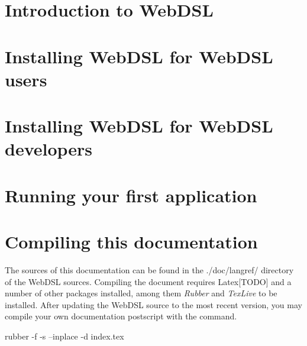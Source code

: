 \chapter{Introduction to WebDSL}


\chapter{Installing WebDSL for WebDSL users}\label{installuser}


\chapter{Installing WebDSL for WebDSL developers}


\chapter{Running your first application }\label{firstapp}


\chapter{Compiling this documentation}
The sources of this documentation can be found in the ./doc/langref/ directory of the WebDSL sources. Compiling the document requires Latex[TODO] and a number of other packages installed, among them \emph{Rubber} and \emph{TexLive} to be installed. After updating the WebDSL source to the most recent version, you may compile your own documentation postscript with the command. 
\begin{shell}
rubber -f -s --inplace -d index.tex
\end{shell}
